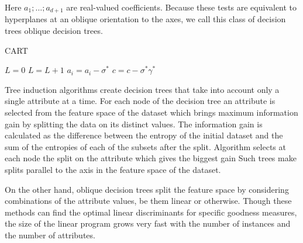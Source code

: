 \documentclass[12pt,preprint]{elsarticle}
\begin{document}
Here $a_1; \dots ; a_{d+1}$ are real-valued coefficients. Because these tests are equivalent to hyperplanes at an oblique orientation to the axes, we call this class of decision trees oblique
decision trees.

\begin{algorithm}[ht]
\caption{CART}\label{alg:cap}
\begin{algorithmic}
    \State $L = 0$
        \STATE $L=L+1$
            \ENDFOR
            \STATE $a_i=a_i-\sigma^*$
            \STATE $c=c-\sigma^* \gamma^*$
        \ENDFOR
    \ENDWHILE
\end{algorithmic}
\end{algorithm}

Tree induction algorithms create decision trees that take into  account only a single attribute at  a time. For each node of the decision tree an attribute is selected from the  feature  space  of  the  dataset  which  brings  maximum information gain  by splitting the  data on its  distinct values. The information gain is  calculated as the difference between the entropy of the initial dataset and the sum of the entropies of each of the subsets after the split. Algorithm selects at each node the split on the attribute which gives the biggest gain Such trees  make splits parallel to the axis in the feature  space of the  dataset. 

On the other  hand, oblique decision  trees  split  the  feature  space  by  considering combinations  of  the  attribute  values,  be  them  linear  or otherwise. Though these methods can find the optimal linear discriminants for specific goodness measures, the size of the linear program grows very fast with the number of instances and the number of attributes.
\end{document}
